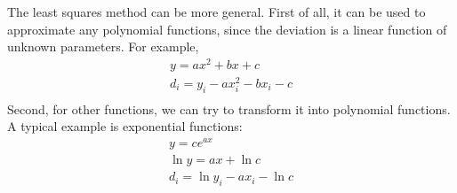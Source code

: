 \documentclass{article}
\begin{document}
\bigskip

The least squares method can be more general. First of all, it can be used to 
approximate any polynomial functions, since the deviation is a linear function 
of unknown parameters. For example,
\begin{gather*}
  y = ax^2 + bx + c \\
  d_i = y_i - ax_i^2 - bx_i - c \\
\end{gather*}
Second, for other functions, we can try to transform it into polynomial 
functions. A typical example is exponential functions:
\begin{gather*}
  y = ce^{ax} \\
  \ln y = ax + \ln c \\
  d_i = \ln y_i - ax_i - \ln c \\
\end{gather*}
\end{document}
